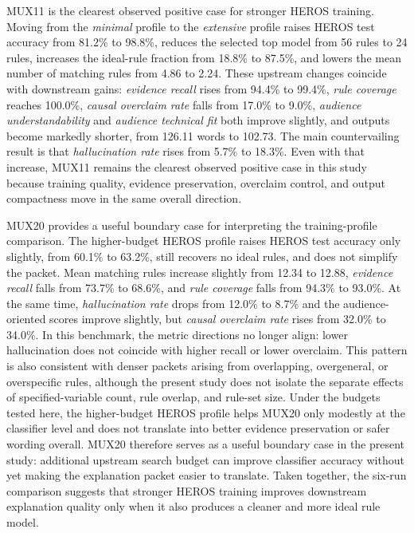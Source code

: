 \documentclass[sigconf]{acmart}
\begin{document}
MUX11 is the clearest observed positive case for stronger HEROS training. Moving from the \emph{minimal} profile to the \emph{extensive} profile raises HEROS test accuracy from 81.2\% to 98.8\%, reduces the selected top model from 56 rules to 24 rules, increases the ideal-rule fraction from 18.8\% to 87.5\%, and lowers the mean number of matching rules from 4.86 to 2.24. These upstream changes coincide with downstream gains: \emph{evidence recall} rises from 94.4\% to 99.4\%, \emph{rule coverage} reaches 100.0\%, \emph{causal overclaim rate} falls from 17.0\% to 9.0\%, \emph{audience understandability} and \emph{audience technical fit} both improve slightly, and outputs become markedly shorter, from 126.11 words to 102.73. The main countervailing result is that \emph{hallucination rate} rises from 5.7\% to 18.3\%. Even with that increase, MUX11 remains the clearest observed positive case in this study because training quality, evidence preservation, overclaim control, and output compactness move in the same overall direction.

MUX20 provides a useful boundary case for interpreting the training-profile comparison. The higher-budget HEROS profile raises HEROS test accuracy only slightly, from 60.1\% to 63.2\%, still recovers no ideal rules, and does not simplify the packet. Mean matching rules increase slightly from 12.34 to 12.88, \emph{evidence recall} falls from 73.7\% to 68.6\%, and \emph{rule coverage} falls from 94.3\% to 93.0\%. At the same time, \emph{hallucination rate} drops from 12.0\% to 8.7\% and the audience-oriented scores improve slightly, but \emph{causal overclaim rate} rises from 32.0\% to 34.0\%. In this benchmark, the metric directions no longer align: lower hallucination does not coincide with higher recall or lower overclaim. This pattern is also consistent with denser packets arising from overlapping, overgeneral, or overspecific rules, although the present study does not isolate the separate effects of specified-variable count, rule overlap, and rule-set size. Under the budgets tested here, the higher-budget HEROS profile helps MUX20 only modestly at the classifier level and does not translate into better evidence preservation or safer wording overall. MUX20 therefore serves as a useful boundary case in the present study: additional upstream search budget can improve classifier accuracy without yet making the explanation packet easier to translate. Taken together, the six-run comparison suggests that stronger HEROS training improves downstream explanation quality only when it also produces a cleaner and more ideal rule model.
\end{document}
